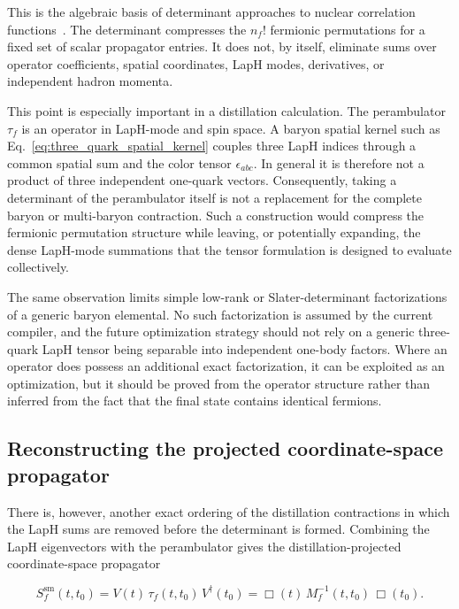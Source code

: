 This is the algebraic basis of determinant approaches to nuclear correlation
functions~\cite{PhysRevD.110.114505}. The determinant compresses the
\(n_f!\) fermionic permutations for a fixed set of scalar propagator entries.
It does not, by itself, eliminate sums over operator coefficients, spatial
coordinates, LapH modes, derivatives, or independent hadron momenta.

This point is especially important in a distillation calculation. The
perambulator \(\tau_f\) is an operator in LapH-mode and spin space. A baryon
spatial kernel such as Eq.~\eqref{eq:three_quark_spatial_kernel} couples three
LapH indices through a common spatial sum and the color tensor
\(\epsilon_{abc}\). In general it is therefore not a product of three
independent one-quark vectors. Consequently, taking a determinant of the
perambulator itself is not a replacement for the complete baryon or
multi-baryon contraction. Such a construction would compress the fermionic
permutation structure while leaving, or potentially expanding, the dense
LapH-mode summations that the tensor formulation is designed to evaluate
collectively.

The same observation limits simple low-rank or Slater-determinant
factorizations of a generic baryon elemental. No such factorization is assumed
by the current compiler, and the future optimization strategy should not rely
on a generic three-quark LapH tensor being separable into independent one-body
factors. Where an operator does possess an additional exact factorization, it
can be exploited as an optimization, but it should be proved from the operator
structure rather than inferred from the fact that the final state contains
identical fermions.

\subsection{Reconstructing the projected coordinate-space propagator}
\label{subsec:future_reconstructed_propagator}

There is, however, another exact ordering of the distillation contractions in
which the LapH sums are removed before the determinant is formed. Combining
the LapH eigenvectors with the perambulator gives the distillation-projected
coordinate-space propagator

\begin{equation}
S_f^{\mathrm{sm}}(t,t_0)
=
V(t)\,\tau_f(t,t_0)\,V^\dagger(t_0)
=
\Box(t)\,M_f^{-1}(t,t_0)\,\Box(t_0).
\label{eq:future_reconstructed_smeared_propagator}
\end{equation}

